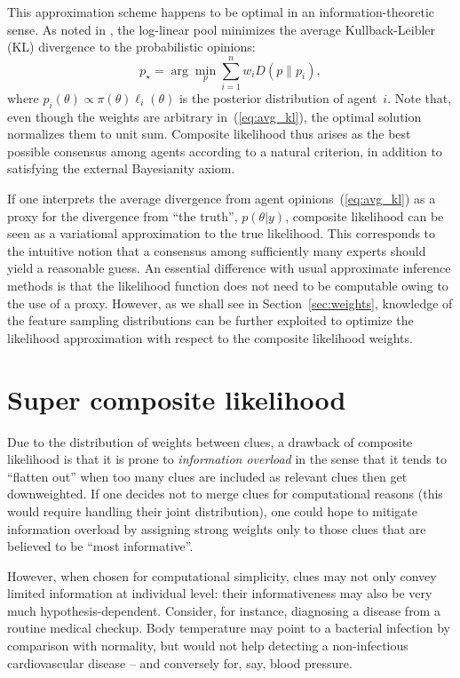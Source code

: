 \documentclass[english]{scrartcl}
\begin{document}
This approximation scheme happens to be optimal in an information-theoretic sense. As noted in \cite{Garg-04}, the log-linear pool minimizes the average Kullback-Leibler (KL) divergence to the probabilistic opinions:
\begin{equation}
\label{eq:avg_kl}
p_\star = \arg\min_p \sum_{i=1}^n w_i D(p\|p_i),
\end{equation}
where $p_i(\theta) \propto \pi(\theta)\ell_i(\theta)$ is the posterior distribution of agent~$i$. Note that, even though the weights are arbitrary in~(\ref{eq:avg_kl}), the optimal solution normalizes them to unit sum. Composite likelihood thus arises as the best possible consensus among agents according to a natural criterion, in addition to satisfying the external Bayesianity axiom. 

If one interprets the average divergence from agent opinions~(\ref{eq:avg_kl}) as a proxy for the divergence from ``the truth'', $p(\theta|y)$, composite likelihood can be seen as a variational approximation to the true likelihood. This corresponds to the intuitive notion that a consensus among sufficiently many experts should yield a reasonable guess. An essential difference with usual approximate inference methods \cite{Bishop-06,Minka-05} is that the likelihood function does not need to be computable owing to the use of a proxy. However, as we shall see in Section~\ref{sec:weights}, knowledge of the feature sampling distributions can be further exploited to optimize the likelihood approximation with respect to the composite likelihood weights.


\section{Super composite likelihood}
\label{sec:super}

Due to the distribution of weights between clues, a drawback of composite likelihood is that it is prone to {\em information overload} in the sense that it tends to ``flatten out'' when too many clues are included as relevant clues then get downweighted. If one decides not to merge clues for computational reasons (this would require handling their joint distribution), one could hope to mitigate information overload by assigning strong weights only to those clues that are believed to be ``most informative''. 

However, when chosen for computational simplicity, clues may not only convey limited information at individual level: their informativeness may also be very much hypothesis-dependent. Consider, for instance, diagnosing a disease from a routine medical checkup. Body temperature may point to a bacterial infection by comparison with normality, but would not help detecting a non-infectious cardiovascular disease -- and conversely for, say, blood pressure.
\end{document}
